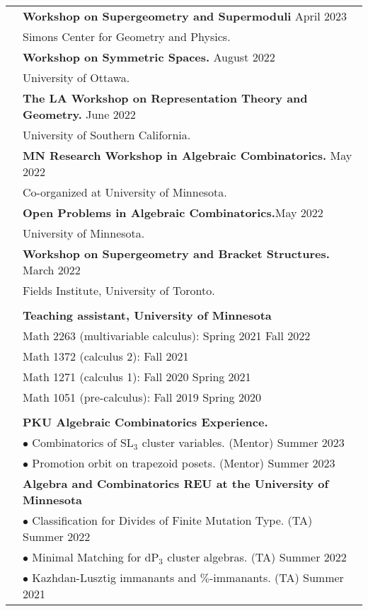 \documentclass[letterpaper, 11pt,times]{article}
\newcommand{\mycolor}[0]{\color{RoyalBlue}}
\newlength{\myl}
\newcommand{\ind}[0]{\hspace{\myl}}
\newlength{\newl}
\begin{document}
\begin{longtable}{p{1in}p{5in}}
{\mycolor{Activities}} 
& \textbf{Workshop on Supergeometry and Supermoduli} \hfill April 2023 \\
&\ind  Simons Center for Geometry and Physics. \\
& \textbf{Workshop on Symmetric Spaces.} \hfill August 2022 \\
&\ind  University of Ottawa. \\
& \textbf{The LA Workshop on Representation Theory and Geometry.} \hfill June 2022 \\
&\ind  University of Southern California. \\
& \textbf{MN Research Workshop in Algebraic Combinatorics.} \hfill May 2022 \\
&\ind  Co-organized at University of Minnesota. \\
&\textbf{Open Problems in Algebraic Combinatorics.}\hfill May 2022\\
&\ind University of Minnesota.\\
&\textbf{Workshop on Supergeometry and Bracket Structures.} \hfill March 2022\\
&\ind Fields Institute, University of Toronto.\\
& \\


{\mycolor{Teaching}} 
& \textbf{Teaching assistant, University of Minnesota}  \\
&\ind  Math 2263 (multivariable calculus): Spring 2021 Fall 2022\\
&\ind  Math 1372 (calculus 2): Fall 2021\\
&\ind  Math 1271 (calculus 1): Fall 2020 Spring 2021\\
&\ind  Math 1051 (pre-calculus): Fall 2019 Spring 2020\\
\\
{\mycolor{Mentoring}} 
&\textbf{PKU Algebraic Combinatorics Experience.}\\

&\ind $\bullet$ Combinatorics of $\text{SL}_3$ cluster variables. (Mentor) \hfill Summer 2023\\
&\ind $\bullet$ Promotion orbit on trapezoid posets. (Mentor) \hfill Summer 2023\\
& \textbf{Algebra and Combinatorics REU at the University of Minnesota}  \\
&\ind $\bullet$ Classification for Divides of Finite Mutation Type. (TA)  \hfill Summer 2022\\
&\ind $\bullet$ Minimal Matching for $\text{dP}_3$ cluster algebras. (TA) \hfill Summer 2022\\
&\ind  $\bullet$ Kazhdan-Lusztig immanants and $\%$-immanants. (TA) \hfill Summer 2021\\


\end{longtable}
\end{document}
